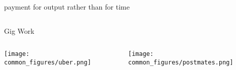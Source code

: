 \documentclass[../presentation]{subfiles}
\begin{document}
\begin{frame}[t]{payment for output rather than for time}
{\begin{columns}[b]
      \begin{column}[t]{0.45\textwidth}
        \centering
        Gig Work

        \vspace{0.5em}

        \begin{columns}
          \begin{column}{.5\textwidth}
            \texttt{[image: common\_figures/uber.png]}
          \end{column}
          \begin{column}{.5\textwidth}
            \texttt{[image: common\_figures/postmates.png]}
          \end{column}
        \end{columns}
      \end{column}
    \end{columns}
  }
\end{frame}


\begin{frame} %

      \centering
        
\end{frame}
\end{document}
